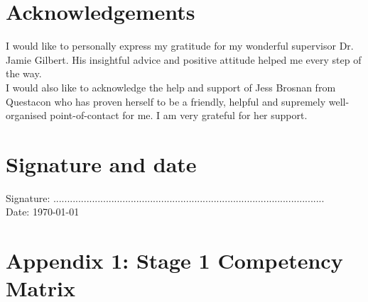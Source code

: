 \documentclass[11pt]{article}
\begin{document}
\newpage

\section{Acknowledgements}

I would like to personally express my gratitude for my wonderful supervisor Dr. Jamie Gilbert. His insightful advice and positive attitude helped me every step of the way. \\

I would also like to acknowledge the help and support of Jess Brosnan from Questacon who has proven herself to be a friendly, helpful and supremely well-organised point-of-contact for me. I am very grateful for her support.\\

\section{Signature and date}

\medskip

Signature: .................................................................................................. \\
Date: \today

\newpage

\section{Appendix 1: Stage 1 Competency Matrix}
\end{document}
